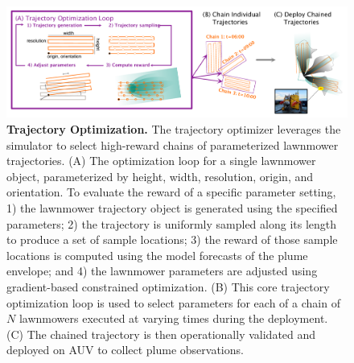 \begin{figure}[h!]
    \centering
    \includegraphics[width=1\columnwidth]{figures/trajectory_optimization.pdf}
    \caption{\textbf{Trajectory Optimization.} The trajectory optimizer leverages the \PHUMES simulator to select high-reward chains of parameterized lawnmower trajectories. (A) The optimization loop for a single lawnmower object, parameterized by height, width, resolution, origin, and orientation. To evaluate the reward of a specific parameter setting, 1) the lawnmower trajectory object is generated using the specified parameters; 2) the trajectory is uniformly sampled along its length to produce a set of sample locations; 3) the reward of those sample locations is computed using the \PHUMES model forecasts of the plume envelope; and 4) the lawnmower parameters are adjusted using gradient-based constrained optimization. (B) This core trajectory optimization loop is used to select parameters for each of a chain of $N$ lawnmowers executed at varying times during the deployment. (C) The chained trajectory is then operationally validated and deployed on AUV \Sentry to collect plume observations.}
    \label{fig:traj_opt}
\end{figure}

